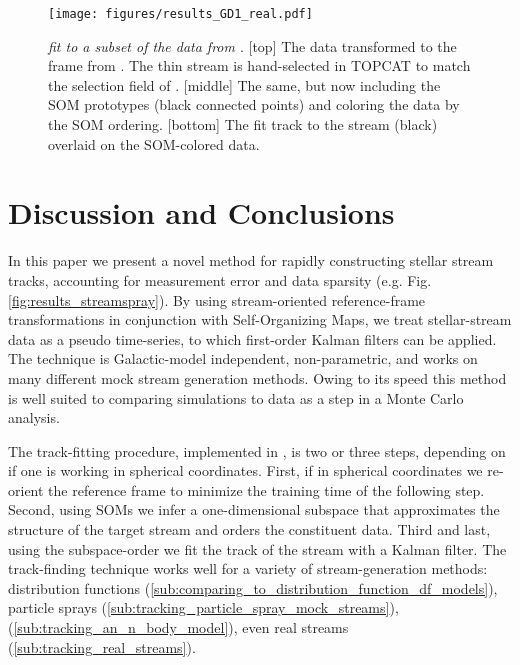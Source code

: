 \documentclass[fleqn,usenatbib]{mnras}
\begin{document}
    \begin{figure}
      \centering
      \texttt{[image: figures/results\_GD1\_real.pdf]}
      \caption{
        \textit{\trackstream{} fit to a subset of the  data from
        \citet{Price-Whelan2018}}.
        [top] The data transformed to the frame from \citet{Koposov2010}. The
        thin stream is hand-selected in TOPCAT \citep{Taylor2005} to match the
        selection field of \citet[][figure 2]{Price-Whelan2018}.
        [middle] The same, but now including the SOM prototypes (black connected
        points) and coloring the data by the SOM ordering.
        [bottom] The fit track to the stream (black) overlaid on the SOM-colored
      data. }
      \label{fig:results_GD1_real}
    \end{figure}
  





\section{Discussion and Conclusions} \label{sec:discussion}

    In this paper we present a novel method for rapidly constructing stellar
    stream tracks, accounting for measurement error and data sparsity  (e.g.
    Fig. \ref{fig:results_streamspray}). By using stream-oriented
    reference-frame transformations in conjunction with Self-Organizing Maps, we
    treat stellar-stream data as a pseudo time-series, to which first-order
    Kalman filters can be applied. The technique is Galactic-model independent,
    non-parametric, and works on many different mock stream generation methods.
    Owing to its speed this method is well suited to comparing simulations to
    data as a step in a Monte Carlo analysis.

    The track-fitting procedure, implemented in
    \href{https://github.com/nstarman/trackstream}{\trackstream{}}, is two or
    three steps, depending on if one is working in spherical coordinates. First,
    if in spherical coordinates we re-orient the reference frame to minimize the
    training time of the following step. Second, using SOMs we infer a
    one-dimensional subspace that approximates the structure of the target
    stream and orders the constituent data. Third and last, using the
    subspace-order we fit the track of the stream with a Kalman filter. The
    track-finding technique works well for a variety of stream-generation
    methods: distribution functions
    (\autoref{sub:comparing_to_distribution_function_df_models}), particle
    sprays (\autoref{sub:tracking_particle_spray_mock_streams}), \nbodys{}
    (\autoref{sub:tracking_an_n_body_model}), even real streams
    (\autoref{sub:tracking_real_streams}).
\end{document}
